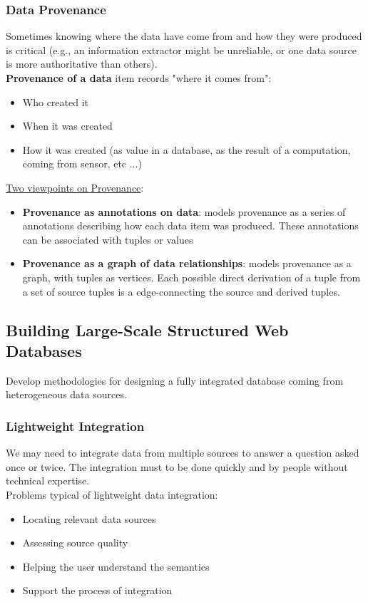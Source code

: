 \documentclass[10pt,a4paper]{article}
\begin{document}
\subsubsection{Data Provenance}
Sometimes knowing where the data have come from and how they were produced is critical (e.g., an information extractor might be unreliable, or one data source is more authoritative than others). \\
\textbf{Provenance of a data} item records "where it comes from":
\begin{itemize}
	\item Who created it
	\item When it was created
	\item How it was created (as value in a database, as the result of a computation, coming from sensor, etc ...)
\end{itemize}
\uline{Two viewpoints on Provenance}:
\begin{itemize}
	\item \textbf{Provenance as annotations on data}: models provenance as a series of annotations describing how each data item was produced. These annotations can be associated with tuples or values
	\item \textbf{Provenance as a graph of data relationships}: models provenance as a graph, with tuples as vertices. Each possible direct derivation of a tuple from a set of source tuples is a edge-connecting the source and derived tuples.
\end{itemize}
\subsection{Building Large-Scale Structured Web Databases}
Develop methodologies for designing a fully integrated database coming from heterogeneous data sources.
\subsubsection{Lightweight Integration}
We may need to integrate data from multiple sources to answer a question asked once or twice. The integration must to be done quickly and by people without technical expertise.
\\ Problems typical of lightweight data integration:
\begin{itemize}
	\item Locating relevant data sources
	\item Assessing source quality
	\item Helping the user understand the semantics
	\item Support the process of integration
\end{itemize}
\end{document}
